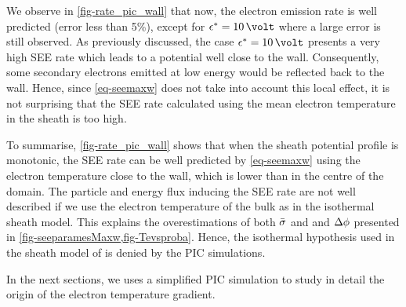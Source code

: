    We observe in \cref{fig-rate_pic_wall} that now, the electron emission rate is well predicted (error less than 5\%), except for $\crover=10\,\volt$ where a large error is still observed.
   As previously discussed, the case $\crover=10\,\volt$ presents a very high SEE rate which leads to a potential well close to the wall.
   Consequently, some secondary electrons emitted at low energy would be reflected back to the wall.
   Hence, since \cref{eq-seemaxw} does not take into account this local effect, it is not surprising that the SEE rate calculated using the mean electron temperature in the sheath is too high.
   
   To summarise, \cref{fig-rate_pic_wall} shows that when the sheath potential profile is monotonic, the \ac{SEE} rate can be well predicted by \cref{eq-seemaxw} using the electron temperature close to the wall, which is lower than in the centre of the domain.
   The particle and energy flux inducing the \ac{SEE} rate are not well described if we use the electron temperature of the bulk as in the isothermal sheath model.
   This explains the overestimations of both $ \bar{\sigma }$ and and $\Delta \phi$ presented in \cref{fig-seeparamesMaxw,fig-Tevsproba}.
   Hence, the isothermal hypothesis used in the sheath model of  is denied by the PIC simulations.
   
   In the next sections, we uses a simplified \ac{PIC} simulation to study in detail the origin of the electron temperature gradient.
   

